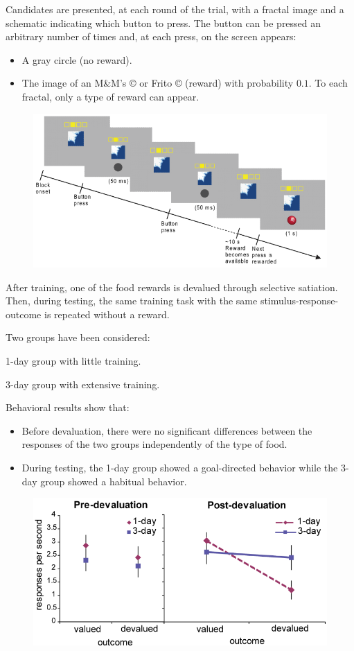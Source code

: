 \begin{casestudy}
    Candidates are presented, at each round of the trial, with a fractal image and a schematic indicating which button to press.
    The button can be pressed an arbitrary number of times and, at each press, on the screen appears:
    \begin{itemize}
        \item A gray circle (no reward).
        \item The image of an M\&M's {\tiny ©} or Frito {\tiny ©} (reward) with probability $0.1$. 
            To each fractal, only a type of reward can appear.
    \end{itemize} 
    \begin{figure}[H]
        \centering
        \includegraphics[width=0.6\linewidth]{./img/human_habitual_experiment.png}
    \end{figure}

    After training, one of the food rewards is devalued through selective satiation.
    Then, during testing, the same training task with the same stimulus-response-outcome is repeated without a reward.

    Two groups have been considered:
    \begin{descriptionlist}
        \item[1-day group] with little training.
        \item[3-day group] with extensive training.
    \end{descriptionlist}

    Behavioral results show that:
    \begin{itemize}
        \item Before devaluation, there were no significant differences between the responses of the two groups independently of the type of food.
        \item During testing, the 1-day group showed a goal-directed behavior while the 3-day group showed a habitual behavior.
    \end{itemize}
    \begin{figure}[H]
        \centering
        \includegraphics[width=0.55\linewidth]{./img/human_habitual_experiment2.png}
    \end{figure}


\end{casestudy}
